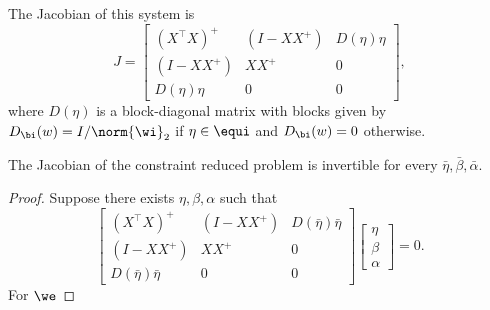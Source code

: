 The Jacobian of this system is
\begin{equation}
	J =
	\begin{bmatrix}
		(X^\top X)^+ & (I - X X^+) & D(\eta) \eta \\
		(I - X X^+)  & X X^+       & 0            \\
		D(\eta) \eta & 0           & 0
	\end{bmatrix},
\end{equation}
where \( D(\eta) \) is a block-diagonal matrix with blocks given by
\( D_\bi(w) = I / \norm{\wi}_2 \) if \( \eta \in \equi \)
and \( D_\bi(w) = 0 \) otherwise.

\begin{proposition}
	The Jacobian of the constraint reduced problem is invertible
	for every \( \bar \eta, \bar \beta, \bar \alpha \).
\end{proposition}
\begin{proof}
	Suppose there exists \( \eta, \beta, \alpha \) such that
	\[
		\begin{bmatrix}
			(X^\top X)^+           & (I - X X^+) & D(\bar \eta) \bar \eta \\
			(I - X X^+)            & X X^+       & 0                      \\
			D(\bar \eta) \bar \eta & 0           & 0
		\end{bmatrix}
		\begin{bmatrix}
			\eta  \\
			\beta \\
			\alpha
		\end{bmatrix}
		= 0.
	\]
	For \( \we \)
\end{proof}




